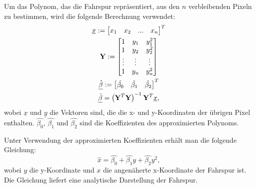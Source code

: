\documentclass[arbeit=studie,oneside,BCOR=12mm]{ArbeitRST}
\begin{document}
Um das Polynom, das die Fahrspur repräsentiert, aus den $n$ verbleibenden
Pixeln zu bestimmen, wird die folgende Berechnung verwendet:
\begin{gather}
    \underline{x} := \begin{bmatrix} x_1 & x_2 & ... & x_n \end{bmatrix}^T \\
    \bold{Y} := \begin{bmatrix} 1 & y_1 & y_1^2 \\ 1 & y_2 & y_2^2 \\ \vdots & \vdots & \vdots \\ 1 & y_n & y_n^2 \end{bmatrix} \\
    \underline{\hat{\beta}} := \begin{bmatrix} \hat{\beta_0} & \hat{\beta_1} & \hat{\beta_2} \end{bmatrix}^T \\
    \underline{\hat{\beta}} = \left(\bold{Y}^T\bold{Y}\right)^{-1}\bold{Y}^T\underline{x},
\end{gather}
wobei $\underline{x}$ und $\underline{y}$ die Vektoren sind, die die x- und
y-Koordinaten der übrigen Pixel enthalten. $\hat{\beta_0}$, $\hat{\beta_1}$ und
$\hat{\beta_2}$ sind die Koeffizienten des approximierten Polynoms. 

Unter Verwendung der approximierten Koeffizienten erhält man die folgende Gleichung:
\begin{equation}
    \hat{x} = \hat{\beta_0} + \hat{\beta_1}y + \hat{\beta_2}y^2,
\end{equation}
wobei $y$ die y-Koordinate und $\hat{x}$ die angenäherte x-Koordinate der
Fahrspur ist. Die Gleichung liefert eine analytische Darstellung der Fahrspur. 
\end{document}
